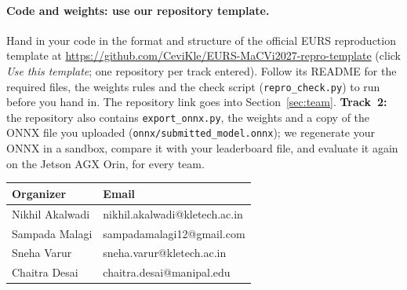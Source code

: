 \documentclass{article}
\begin{document}
{\paragraph{Code and weights: use our repository template.} Hand in your code in the format and structure of the official EURS reproduction template at \url{https://github.com/CeviKle/EURS-MaCVi2027-repro-template} (click \emph{Use this template}; one repository per track entered). Follow its README for the required files, the weights rules and the check script (\texttt{repro\_check.py}) to run before you hand in. The repository link goes into Section~\ref{sec:team}. \textbf{Track~2:} the repository also contains \texttt{export\_onnx.py}, the weights and a copy of the ONNX file you uploaded (\texttt{onnx/submitted\_model.onnx}); we regenerate your ONNX in a sandbox, compare it with your leaderboard file, and evaluate it again on the Jetson AGX Orin, for every team.

\begin{table}[h]
\begin{center}
\begin{tabular}{|l|l|}
    \hline
    \textbf{Organizer} & \textbf{Email} \\
    \hline
    Nikhil Akalwadi & nikhil.akalwadi@kletech.ac.in \\
    Sampada Malagi & sampadamalagi12@gmail.com \\
    Sneha Varur & sneha.varur@kletech.ac.in \\
    Chaitra Desai & chaitra.desai@manipal.edu \\
    \hline
\end{tabular}
\end{center}
\end{table}

}
\end{document}

